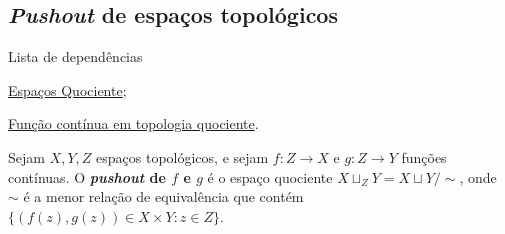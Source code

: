 \subsection{\emph{Pushout} de espaços topológicos} %

\label{pushout-de-espacos-topologicos-def}
\begin{titlemize}{Lista de dependências}
	\item \hyperref[topologia-quociente-def]{Espaços Quociente};\\ %
    \item \hyperref[funcao-continua-em-topologia-quociente-prop]{Função contínua em topologia quociente}.
\end{titlemize}

\begin{defi}
    Sejam $X,Y,Z$ espaços topológicos, e sejam $f:Z\rightarrow X$ e $g:Z\rightarrow Y$ funções contínuas. O \textbf{\emph{pushout} de $f$ e $g$} é o espaço quociente $X\sqcup_Z Y=X\sqcup Y/\sim$, onde $\sim$ é a menor relação de equivalência que contém $\{(f(z),g(z))\in X\times Y:z\in Z\}$. 

\end{defi}


